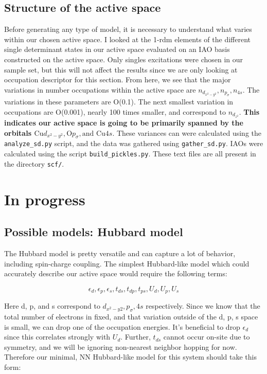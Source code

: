 \documentclass{article}
\begin{document}
\subsection{Structure of the active space}
Before generating any type of model, it is necessary to understand what varies within our chosen active space. I looked at the 1-rdm elements of the different single determinant states in our active space evaluated on an IAO basis constructed on the active space. Only singles excitations were chosen in our sample set, but this will not affect the results since we are only looking at occupation descriptor for this section. From here, we see that the major variations in number occupations within the active space are $n_{d_{x^2-y^2}}, n_{p_\sigma}, n_{4s}$. The variations in these parameters are O(0.1). The next smallest variation in occupations are O(0.001), nearly 100 times smaller, and correspond to $n_{d_{z^2}}$. \textbf{This indicates our active space is going to be primarily spanned by the orbitals $\text{Cu}{d_{x^2-y^2}}, \text{O}{p_\sigma}, \text{and Cu}{4s}$}. These variances can were calculated using the \texttt{analyze\_sd.py} script, and the data was gathered using \texttt{gather\_sd.py}. IAOs were calculated using the script \texttt{build\_pickles.py}. These text files are all present in the directory \texttt{scf/}.

\section{In progress}
\subsection{Possible models: Hubbard model}
The Hubbard model is pretty versatile and can capture a lot of behavior, including spin-charge coupling. The simplest Hubbard-like model which could accurately describe our active space would require the following terms: 

$$\epsilon_{d},\epsilon_{p}, \epsilon_{s}, t_{ds}, t_{dp}, t_{ps}, U_d, U_p, U_s$$

Here d, p, and s correspond to $d_{x^2-y2}, p_\sigma, 4s$ respectively. Since we know that the total number of electrons in fixed, and that variation outside of the d, p, s space is small, we can drop one of the occupation energies. It's beneficial to drop $\epsilon_d$ since this correlates strongly with $U_d$. Further, $t_{ds}$ cannot occur on-site due to symmetry, and we will be ignoring non-nearest neighbor hopping for now. Therefore our minimal, NN Hubbard-like model for this system should take this form:
\end{document}
